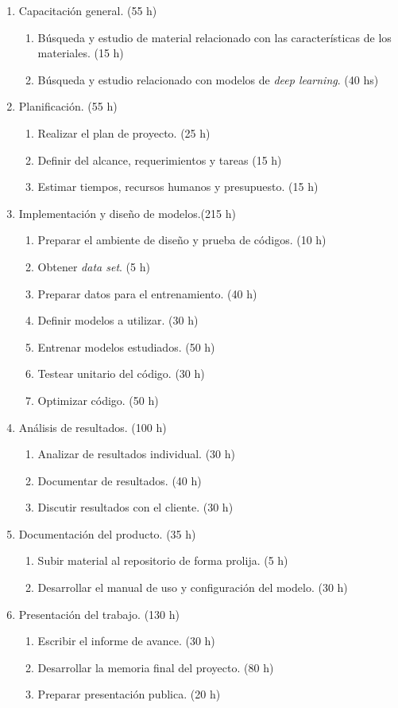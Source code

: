 \documentclass[
11pt, %
codirector, %
]{charter}
\begin{document}
\begin{enumerate}
\item Capacitación general. (55 h)
	\begin{enumerate}
	\item Búsqueda y estudio de material relacionado con las características
	de los materiales. (15 h)
	\item Búsqueda y estudio relacionado con modelos de \textit{deep learning}.
	(40 hs)
	\end{enumerate}
\item Planificación. (55 h)
	\begin{enumerate}
	\item Realizar el plan de proyecto. (25 h)
	\item Definir del alcance, requerimientos y tareas (15 h)
	\item Estimar tiempos, recursos humanos y presupuesto. (15 h)
	\end{enumerate}
\item Implementación y diseño de modelos.(215 h)
	\begin{enumerate}
	\item Preparar el ambiente de diseño y prueba de códigos. (10 h)
	\item Obtener \textit{data set}. (5 h)
	\item Preparar datos para el entrenamiento. (40 h)
	\item Definir modelos a utilizar. (30 h)
	\item Entrenar modelos estudiados. (50 h)
	\item Testear unitario del código. (30 h)
	\item Optimizar código. (50 h)
	\end{enumerate}
\item Análisis de resultados. (100 h)
	\begin{enumerate}
	\item Analizar de resultados individual. (30 h)
	\item Documentar de resultados. (40 h)
	\item Discutir resultados con el cliente. (30 h)
	\end{enumerate}
\item Documentación del producto. (35 h)
	\begin{enumerate}
		\item Subir material al repositorio de forma prolija. (5 h)
		\item Desarrollar el manual de uso y configuración del modelo. (30 h)
	\end{enumerate}
\item Presentación del trabajo. (130 h)
	\begin{enumerate}
		\item Escribir el informe de avance. (30 h)
		\item Desarrollar la memoria final del proyecto. (80 h)
		\item Preparar presentación publica. (20 h)
	\end{enumerate}
\end{enumerate}
\end{document}
